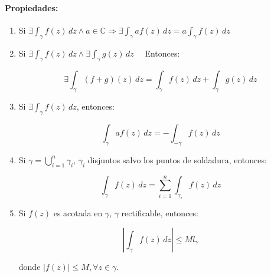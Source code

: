 \documentclass[a4paper,12pt]{article}
\begin{document}
\paragraph{Propiedades:}
\begin{enumerate}
    \item Si $\exists \int_{\gamma} f(z) \, dz \wedge a \in \mathbb{C} \Rightarrow \exists \int_{\gamma} a f(z) \, dz = a \int_{\gamma} f(z) \, dz$

\item Si $\exists \int_{\gamma} f(z) \, dz \wedge \exists \int_{\gamma} g(z) \, dz \quad$ Entonces:

\[
\exists \int_{\gamma} (f + g)(z) \, dz = \int_{\gamma} f(z) \, dz + \int_{\gamma} g(z) \, dz
\]

\item  Si $\exists \int_{\gamma} f(z) \, dz$, entonces:

\[
\int_{\gamma} a f(z) \, dz = - \int_{-\gamma} f(z) \, dz
\]

\item  Si $\gamma = \bigcup_{i=1}^{n} \gamma_i$, $\gamma_i$ disjuntos salvo los puntos de soldadura, entonces:

\[
\int_{\gamma} f(z) \, dz = \sum_{i=1}^{n} \int_{\gamma_i} f(z) \, dz
\]

\item  Si $f(z)$ es acotada en $\gamma$, $\gamma$ rectificable, entonces:

\[
\left| \int_{\gamma} f(z) \, dz \right| \leq M l_{\gamma}
\]

donde $|f(z)| \leq M, \forall z \in \gamma$.
\end{enumerate}


\end{document}
